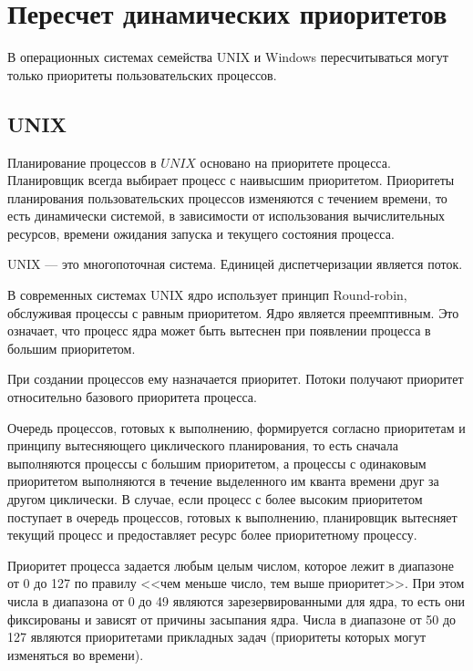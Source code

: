 \section{Пересчет динамических приоритетов}

В операционных системах семейства UNIX и Windows пересчитываться могут только приоритеты пользовательских процессов. 

\subsection{UNIX}

Планирование процессов в $UNIX$ основано на приоритете процесса. Планировщик всегда выбирает процесс с наивысшим приоритетом. Приоритеты планирования пользовательских процессов изменяются с течением времени, то есть динамически системой, в зависимости от использования вычислительных ресурсов, времени ожидания запуска и текущего состояния процесса. 

UNIX --- это многопоточная система. Единицей диспетчеризации является поток.  

В современных системах UNIX ядро использует принцип Round-robin, обслуживая процессы с равным приоритетом. Ядро является преемптивным. Это означает, что процесс ядра может быть вытеснен при появлении процесса в большим приоритетом. %

При создании процессов ему назначается приоритет. Потоки получают приоритет относительно базового приоритета процесса. 

Очередь процессов, готовых к выполнению, формируется согласно приоритетам и принципу вытесняющего циклического планирования, то есть сначала выполняются процессы с большим приоритетом, а процессы с одинаковым приоритетом выполняются в течение выделенного им кванта времени друг за другом циклически. В случае, если процесс с более высоким приоритетом поступает в очередь процессов, готовых к выполнению, планировщик вытесняет текущий процесс и предоставляет ресурс более приоритетному процессу.

Приоритет процесса задается любым целым числом, которое лежит в диапазоне от 0 до 127 по правилу <<чем меньше число, тем выше приоритет>>. При этом числа в диапазона от 0 до 49 являются зарезервированными для ядра, то есть они фиксированы и зависят от причины засыпания ядра. Числа в диапазоне от 50 до 127 являются приоритетами прикладных задач (приоритеты которых могут изменяться во времени).

